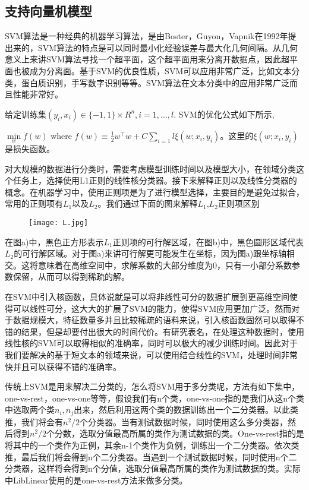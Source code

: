 \documentclass[master]{njuthesis}
\begin{document}
\subsection{支持向量机模型}

    SVM算法是一种经典的机器学习算法，是由Boster，Guyon，Vapnik在1992年提出来的，SVM算法的特点是可以同时最小化经验误差与最大化几何间隔。从几何意义上来讲SVM算法寻找一个超平面，这个超平面用来分离开数据点，因此超平面也被成为分离面。基于SVM的优良性质，SVM可以应用非常广泛，比如文本分类，蛋白质识别，手写数字识别等等。SVM算法在文本分类中的应用非常广泛而且性能非常好。
    
    给定训练集$\left(y_i,x_i\right) \in \{-1,1\} \times R^n,i=1,\dots,l.$ SVM的优化公式如下所示,
    
    $\min\limits_{w} f\left(w\right)$ where $f\left(w\right) \equiv \frac{1}{2} w^\intercal w+C\sum_{i=1}{l} \xi\left(w;x_i,y_i\right)$。这里的$\xi\left(w;x_i,y_i\right)$是损失函数。

    对大规模的数据进行分类时，需要考虑模型训练时间以及模型大小，在领域分类这个任务上，选择使用L1正则的线性核分类器。接下来解释正则以及线性分类器的概念。在机器学习中，使用正则项是为了进行模型选择，主要目的是避免过拟合，常用的正则项有$L_1$以及$L_2$。我们通过下面的图来解释$L_1$,$L_2$正则项区别
   
    \begin{figure}[htbp]
      \centering
      \texttt{[image: L.jpg]}\\
      \caption{}\label{fig:L}
    \end{figure}
    
    在图a)中，黑色正方形表示$L_1$正则项的可行解区域，在图b)中，黑色圆形区域代表$L_2$的可行解区域。对于图a)来讲可行解更可能发生在坐标，因为图a)跟坐标轴相交。这将意味着在高维空间中，求解系数的大部分维度为0，只有一小部分系数参数保留，从而可以得到稀疏的解。
   
    在SVM中引入核函数，具体说就是可以将非线性可分的数据扩展到更高维空间使得可以线性可分，这大大的扩展了SVM的能力，使得SVM应用更加广泛。然而对于数据规模大，特征数量多并且比较稀疏的语料来说，引入核函数固然可以取得不错的结果，但是却要付出很大的时间代价。有研究表名，在处理这种数据时，使用线性核的SVM可以取得相似的准确率，同时可以极大的减少训练时间。因此对于我们要解决的基于短文本的领域来说，可以使用结合线性的SVM，处理时间非常快并且可以获得不错的准确率。

    传统上SVM是用来解决二分类的，怎么将SVM用于多分类呢，方法有如下集中，one-vs-rest，one-vs-one等等，假设我们有n个类，one-vs-one指的是我们从这n个类中选取两个类$n_i,n_j$出来，然后利用这两个类的数据训练出一个二分类器。以此类推，我们将会有$n^2/2$个分类器。当有测试数据时候，同时使用这么多分类器，然后得到$n^2/2$个分数，选取分值最高所属的类作为测试数据的类。One-vs-rest指的是将其中的一个类作为正例，其余n-1个类作为负例，训练出一个二分类器。依次类推，最后我们将会得到n个二分类器。当遇到一个测试数据时候，同时使用n个二分类器，这样将会得到n个分值，选取分值最高所属的类作为测试数据的类。实际中LibLinear使用的是one-vs-rest方法来做多分类。
    
\end{document}

